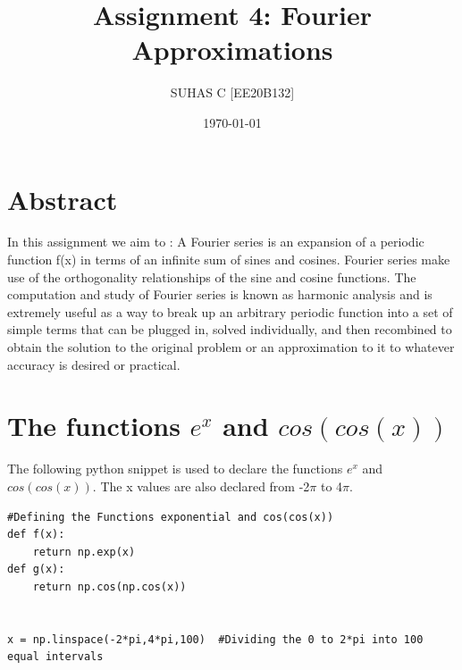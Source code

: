 \documentclass[11pt, a4paper]{article}
\title{Assignment 4: Fourier Approximations} %
\author{SUHAS C [EE20B132]} %
\date{\today} %
\begin{document}
	
		
\maketitle %
\section*{Abstract}
In this assignment we aim to :\newline
A Fourier series is an expansion of a periodic function f(x) in terms of an infinite sum of sines and cosines.
Fourier series make use of the orthogonality relationships of the sine and cosine functions. The computation
and study of Fourier series is known as harmonic analysis and is extremely useful as a way to break up an
arbitrary periodic function into a set of simple terms that can be plugged in, solved individually, and then
recombined to obtain the solution to the original problem or an approximation to it to whatever accuracy is
desired or practical.


\section{The functions $e^{x}$ and $cos(cos(x))$}
The following python snippet is used to declare the functions $e^{x}$ and $cos(cos(x))$. The x values are also declared from -2$\pi$ to 4$\pi$.

\begin{verbatim}
#Defining the Functions exponential and cos(cos(x))
def f(x):
    return np.exp(x)
def g(x):
    return np.cos(np.cos(x))


x = np.linspace(-2*pi,4*pi,100)  #Dividing the 0 to 2*pi into 100 equal intervals
\end{verbatim}
\end{document}

